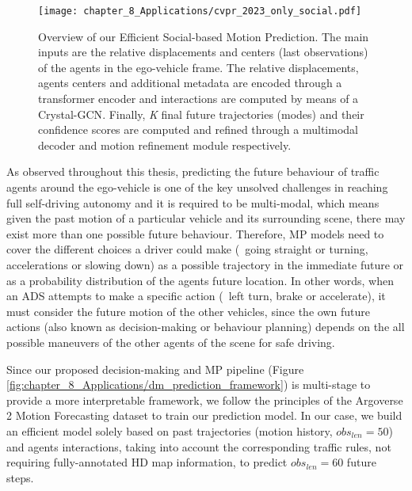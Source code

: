 \begin{figure}[h]
	\centering
	\setlength{\tabcolsep}{2.0pt}
	\texttt{[image: chapter\_8\_Applications/cvpr\_2023\_only\_social.pdf]}
	\captionsetup{justification=justified}
	\caption{Overview of our Efficient Social-based Motion Prediction. The main inputs are the relative displacements and centers (last observations) of the agents in the ego-vehicle frame. The relative displacements, agents centers and additional metadata are encoded through a transformer encoder and interactions are computed by means of a Crystal-\ac{GCN}. Finally, \textit{K} final future trajectories (modes) and their confidence scores are computed and refined through a multimodal decoder and motion refinement module respectively.}
	
	\label{fig:chapter_8_Applications/cvpr_2023_only_social}
\end{figure}

As observed throughout this thesis, predicting the future behaviour of traffic agents around the ego-vehicle is one of the key unsolved challenges in reaching full self-driving autonomy and it is required to be multi-modal, which means given the past motion of a particular vehicle and its surrounding scene, there may exist more than one possible future behaviour. Therefore, MP models need to cover the different choices a driver could make (\ie \ going straight or turning, accelerations or slowing down) as a possible trajectory in the immediate future or as a probability distribution of the agents future location. In other words, when an \ac{ADS} attempts to make a specific action (\eg \ left turn, brake or accelerate), it must consider the future motion of the other vehicles, since the own future actions (also known as decision-making or behaviour planning) depends on the all possible maneuvers of the other agents of the scene for safe driving. %

Since our proposed decision-making and \ac{MP} pipeline (Figure \ref{fig:chapter_8_Applications/dm_prediction_framework}) is multi-stage to provide a more interpretable framework, we follow the principles of the Argoverse 2 Motion Forecasting dataset \cite{wilson2023argoverse} to train our prediction model. In our case, we build an efficient model solely based on past trajectories (motion history, $obs_{len} = 50$) and agents interactions, taking into account the corresponding traffic rules, not requiring fully-annotated HD map information, to predict $obs_{len} = 60$ future steps. %

